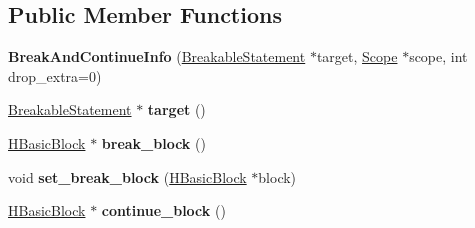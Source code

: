 \subsection*{Public Member Functions}
\begin{DoxyCompactItemize}
\item 
{\bfseries Break\+And\+Continue\+Info} (\hyperlink{classv8_1_1internal_1_1_breakable_statement}{Breakable\+Statement} $\ast$target, \hyperlink{classv8_1_1internal_1_1_scope}{Scope} $\ast$scope, int drop\+\_\+extra=0)\hypertarget{classv8_1_1internal_1_1_h_optimized_graph_builder_1_1_b_a_s_e___e_m_b_e_d_d_e_d_aef83fb7c53d81beab748011bc5772e0e}{}\label{classv8_1_1internal_1_1_h_optimized_graph_builder_1_1_b_a_s_e___e_m_b_e_d_d_e_d_aef83fb7c53d81beab748011bc5772e0e}

\item 
\hyperlink{classv8_1_1internal_1_1_breakable_statement}{Breakable\+Statement} $\ast$ {\bfseries target} ()\hypertarget{classv8_1_1internal_1_1_h_optimized_graph_builder_1_1_b_a_s_e___e_m_b_e_d_d_e_d_a6c4001e02d6f674bd9d4c4567add0b4e}{}\label{classv8_1_1internal_1_1_h_optimized_graph_builder_1_1_b_a_s_e___e_m_b_e_d_d_e_d_a6c4001e02d6f674bd9d4c4567add0b4e}

\item 
\hyperlink{classv8_1_1internal_1_1_h_basic_block}{H\+Basic\+Block} $\ast$ {\bfseries break\+\_\+block} ()\hypertarget{classv8_1_1internal_1_1_h_optimized_graph_builder_1_1_b_a_s_e___e_m_b_e_d_d_e_d_a3d3682e4f540cfd7c5bb7c29604cc6b0}{}\label{classv8_1_1internal_1_1_h_optimized_graph_builder_1_1_b_a_s_e___e_m_b_e_d_d_e_d_a3d3682e4f540cfd7c5bb7c29604cc6b0}

\item 
void {\bfseries set\+\_\+break\+\_\+block} (\hyperlink{classv8_1_1internal_1_1_h_basic_block}{H\+Basic\+Block} $\ast$block)\hypertarget{classv8_1_1internal_1_1_h_optimized_graph_builder_1_1_b_a_s_e___e_m_b_e_d_d_e_d_a32f668cfad8d4bc29bdfdcf9812e8056}{}\label{classv8_1_1internal_1_1_h_optimized_graph_builder_1_1_b_a_s_e___e_m_b_e_d_d_e_d_a32f668cfad8d4bc29bdfdcf9812e8056}

\item 
\hyperlink{classv8_1_1internal_1_1_h_basic_block}{H\+Basic\+Block} $\ast$ {\bfseries continue\+\_\+block} ()\hypertarget{classv8_1_1internal_1_1_h_optimized_graph_builder_1_1_b_a_s_e___e_m_b_e_d_d_e_d_ae34bdcbe95c2cab606146153142832bb}{}\label{classv8_1_1internal_1_1_h_optimized_graph_builder_1_1_b_a_s_e___e_m_b_e_d_d_e_d_ae34bdcbe95c2cab606146153142832bb}


\end{DoxyCompactItemize}
